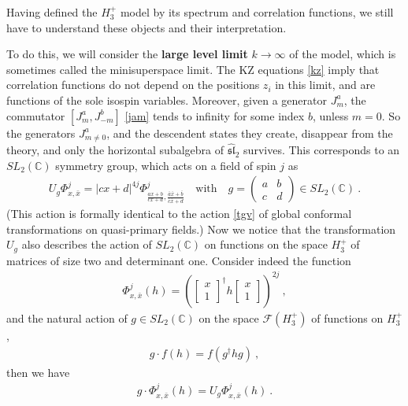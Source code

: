 \documentclass[12pt,a4paper,notitlepage]{report}
\numberwithin{equation}{section}
\theoremstyle{break}
\begin{document}
Having defined the $H_3^+$ model by its spectrum and correlation functions, we still have to understand these objects and their interpretation.  

To do this, we will consider the \textbf{\boldmath large level limit} $k\rightarrow \infty$ of the model, which is sometimes called the minisuperspace limit. 
The KZ equations \eqref{kz} imply that correlation functions do not depend on the positions $z_i$ in this limit, and are functions of the sole isospin variables. 
Moreover, given a generator $J^a_m$, the commutator $[J^a_m,J^b_{-m}]$ \eqref{jam}  tends to infinity for some index $b$, unless $m=0$. 
So the generators $J^a_{m\neq 0}$, and the descendent states they create, disappear from the theory, and only the horizontal subalgebra of $\widehat{\mathfrak{sl}}_2$ survives.
This corresponds to an $SL_2({\mathbb{C}})$ symmetry group, which acts on a field of spin $j$ as 
\begin{align}
 U_g\Phi^j_{x,\bar{x}} = |cx+d|^{4j}\Phi^j_{\frac{ax+b}{cx+d},\frac{\bar{a}\bar{x}+\bar{b}}{\bar{c}\bar{x}+\bar{d}}} \quad \text{with} \quad g = \left(\begin{array}{cc} a & b \\ c & d \end{array}\right) \in SL_2({\mathbb{C}})\ .
\label{ugp}
\end{align}
(This action is formally identical to the action \eqref{tgv} of global conformal transformations on quasi-primary fields.)
Now we notice that the transformation $U_g$ also describes the action of $SL_2({\mathbb{C}})$ on functions on the space $H_3^+$ of matrices of size two and determinant one.
Consider indeed the function
\begin{align}
 \Phi^j_{x,\bar{x}}(h) = \left(\begin{bmatrix}
                                x \\ 1
                               \end{bmatrix}^\dagger 
h \begin{bmatrix}
   x \\ 1 
  \end{bmatrix}
 \right)^{2j}\ ,
\end{align}
and the natural action of $g\in SL_2({\mathbb{C}})$ on the space $\mathcal{F}(H_3^+)$ of functions on $H_3^+$,
\begin{align}
 g\cdot f(h) = f(g^\dagger h g)\ ,
\end{align}
then we have 
\begin{align}
 g\cdot \Phi^j_{x,\bar{x}}(h) = U_g \Phi^j_{x,\bar{x}}(h)\ .
\end{align}
\end{document}
